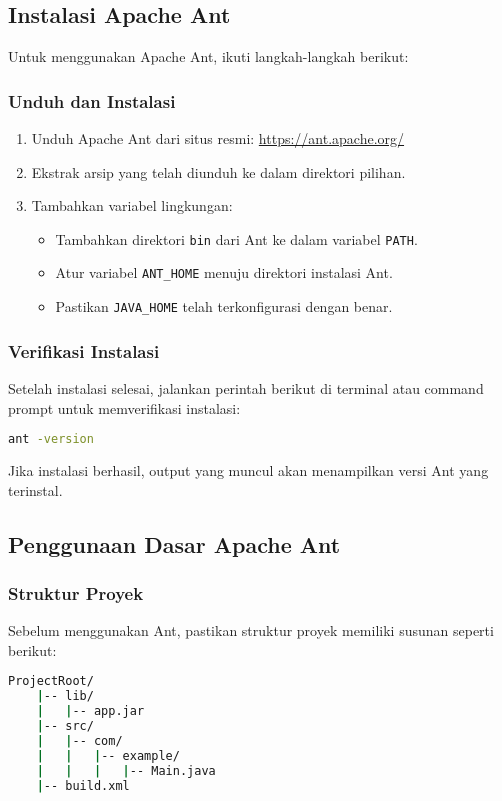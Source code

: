 \subsection{Instalasi Apache Ant}
Untuk menggunakan Apache Ant, ikuti langkah-langkah berikut:

\subsubsection{Unduh dan Instalasi}
\begin{enumerate}
	\item Unduh Apache Ant dari situs resmi: \url{https://ant.apache.org/}
	\item Ekstrak arsip yang telah diunduh ke dalam direktori pilihan.
	\item Tambahkan variabel lingkungan:
	\begin{itemize}
		\item Tambahkan direktori \texttt{bin} dari Ant ke dalam variabel \texttt{PATH}.
		\item Atur variabel \texttt{ANT\_HOME} menuju direktori instalasi Ant.
		\item Pastikan \texttt{JAVA\_HOME} telah terkonfigurasi dengan benar.
	\end{itemize}
\end{enumerate}

\subsubsection{Verifikasi Instalasi}
Setelah instalasi selesai, jalankan perintah berikut di terminal atau command prompt untuk memverifikasi instalasi:

\begin{lstlisting}[language=bash]
	ant -version
\end{lstlisting}

Jika instalasi berhasil, output yang muncul akan menampilkan versi Ant yang terinstal.

\subsection{Penggunaan Dasar Apache Ant}
\subsubsection{Struktur Proyek}
Sebelum menggunakan Ant, pastikan struktur proyek memiliki susunan seperti berikut:

\begin{lstlisting}[language=bash]
	ProjectRoot/
	|-- lib/
	|   |-- app.jar
	|-- src/
	|   |-- com/
	|   |   |-- example/
	|   |   |   |-- Main.java
	|-- build.xml
\end{lstlisting}

